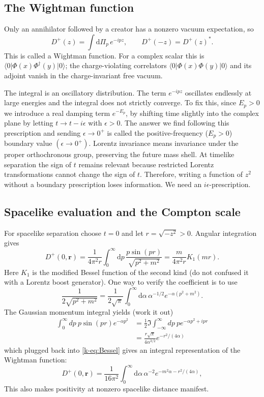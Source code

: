 \documentclass[11pt]{article}
\newcommand{\dd}{\mathrm{d}}
\newcommand{\vac}{\lvert0\rangle}
\newcommand{\vbra}{\langle0\rvert}
\begin{document}
\subsection{The Wightman function}
Only an annihilator followed by a creator has a nonzero vacuum expectation,
so
\begin{equation}
 D^+(z)=\int\dd\Pi_p\,e^{-ipz},\qquad
 D^+(-z)=D^+(z)^*.
 \label{k-eq:Wightman}
\end{equation}
This is called a Wightman function.
For a complex scalar this is
\(\vbra\Phi(x)\Phi^\dagger(y)\vac\); the charge-violating correlators
\(\vbra\Phi(x)\Phi(y)\vac\) and its adjoint vanish in the charge-invariant
free vacuum. 

The integral is an oscillatory distribution. The term $e^{-i p z}$ oscillates endlessly at large energies and the integral does not strictly converge. To fix this, since $E_p>0$ we introduce a real damping term $e^{-E_p}$, by shifting time slightly into the complex plane by letting $t\to t-i \epsilon$ with $\epsilon>0$. The answer we find following this prescription and sending $\epsilon\to 0^+$ is called the  positive-frequency ($E_p>0$)
boundary value $(\epsilon\to 0^+)$. Lorentz invariance means invariance under the
proper orthochronous group, preserving the future mass shell. At timelike
separation the sign of \(t\) remains relevant because restricted Lorentz transformations cannot change the sign of $t$. Therefore, writing a function of
\(z^2\) without a boundary prescription loses information. We need an $i\epsilon$-prescription.

\subsection{Spacelike evaluation and the Compton scale}
For spacelike separation choose \(t=0\) and let \(r=\sqrt{-z^2}>0\).
Angular integration gives
\begin{equation}
 D^+(0,\bm r)=\frac{1}{4\pi^2r}\int_0^\infty\dd p\,
                 \frac{p\sin(pr)}{\sqrt{p^2+m^2}}
              =\frac{m}{4\pi^2r}K_1(mr).
 \label{k-eq:Bessel}
\end{equation}
Here \(K_1\) is the modified Bessel function of the second kind (do not confused it with a
Lorentz boost generator). One way to verify the coefficient is to use
\[
 \frac{1}{2\sqrt{p^2+m^2}}
 =\frac{1}{2\sqrt\pi}\int_0^\infty\dd\alpha\,\alpha^{-1/2}
                         e^{-\alpha(p^2+m^2)}.
\]
The Gaussian momentum integral yields (work it out)
\begin{align}
	\int_0^\infty dp \:p\sin(p r)e^{-\alpha p^2}&=\frac{1}{2}\Im\int_{-\infty}^\infty dp\: p e^{-\alpha p^2+i p r}\nonumber\\
	&=\frac{r \sqrt{\pi}}{4\alpha^{3/2}}e^{-r^2/(4\alpha)}
\end{align}
which plugged back into \eqref{k-eq:Bessel} gives an integral representation of the Wightman function:
\begin{equation}
 D^+(0,\bm r)=\frac{1}{16\pi^2}\int_0^\infty\dd\alpha\,
 \alpha^{-2}e^{-m^2\alpha-r^2/(4\alpha)},
 \label{k-eq:Schwinger}
\end{equation}
This also makes positivity at nonzero spacelike distance manifest.
\end{document}
